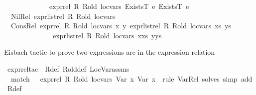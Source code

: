 \begin{isabellebody}
\ \ \ \ \ \ \ \ \ \ \ \ \ expr{\isacharunderscore}{\kern0pt}rel\ R\ R{\isacharunderscore}{\kern0pt}old\ loc{\isacharunderscore}{\kern0pt}vars\ {\isacharparenleft}{\kern0pt}ExistsT\ e{}{\isacharparenright}{\kern0pt}\ {\isacharparenleft}{\kern0pt}ExistsT\ e{}{\isacharparenright}{\kern0pt}{\isachardoublequoteclose}\isanewline
\ {\isacharbar}{\kern0pt}\ Nil{\isacharunderscore}{\kern0pt}Rel{\isacharcolon}{\kern0pt}\ {\isachardoublequoteopen}expr{\isacharunderscore}{\kern0pt}list{\isacharunderscore}{\kern0pt}rel\ R\ R{\isacharunderscore}{\kern0pt}old\ loc{\isacharunderscore}{\kern0pt}vars\ {\isacharbrackleft}{\kern0pt}{\isacharbrackright}{\kern0pt}\ {\isacharbrackleft}{\kern0pt}{\isacharbrackright}{\kern0pt}{\isachardoublequoteclose}\isanewline
\ {\isacharbar}{\kern0pt}\ Cons{\isacharunderscore}{\kern0pt}Rel{\isacharcolon}{\kern0pt}\ {\isachardoublequoteopen}{\isasymlbrakk}expr{\isacharunderscore}{\kern0pt}rel\ R\ R{\isacharunderscore}{\kern0pt}old\ loc{\isacharunderscore}{\kern0pt}vars\ x\ y{\isacharsemicolon}{\kern0pt}\ expr{\isacharunderscore}{\kern0pt}list{\isacharunderscore}{\kern0pt}rel\ R\ R{\isacharunderscore}{\kern0pt}old\ loc{\isacharunderscore}{\kern0pt}vars\ xs\ ys{\isasymrbrakk}\ {\isasymLongrightarrow}\isanewline
\ \ \ \ \ \ \ \ \ \ \ \ \ \ expr{\isacharunderscore}{\kern0pt}list{\isacharunderscore}{\kern0pt}rel\ R\ R{\isacharunderscore}{\kern0pt}old\ loc{\isacharunderscore}{\kern0pt}vars\ {\isacharparenleft}{\kern0pt}x{\isacharhash}{\kern0pt}xs{\isacharparenright}{\kern0pt}\ {\isacharparenleft}{\kern0pt}y{\isacharhash}{\kern0pt}ys{\isacharparenright}{\kern0pt}{\isachardoublequoteclose}%
\begin{isamarkuptext}%
Eisbach tactic to prove two expressions are in the expression relation%
\end{isamarkuptext}\isamarkuptrue%
\isamarkupfalse%
\ expr{\isacharunderscore}{\kern0pt}rel{\isacharunderscore}{\kern0pt}tac\ \ R{\isacharunderscore}{\kern0pt}def\ R{\isacharunderscore}{\kern0pt}old{\isacharunderscore}{\kern0pt}def\ LocVar{\isacharunderscore}{\kern0pt}assms\ {\isacharequal}{\kern0pt}\ \isanewline
\ \ {\isacharparenleft}{\kern0pt}match\ \ \ {\isachardoublequoteopen}expr{\isacharunderscore}{\kern0pt}rel\ {\isacharquery}{\kern0pt}R\ {\isacharquery}{\kern0pt}R{\isacharunderscore}{\kern0pt}old\ {\isacharquery}{\kern0pt}loc{\isacharunderscore}{\kern0pt}vars\ {\isacharparenleft}{\kern0pt}Var\ {\isacharquery}{\kern0pt}x{}{\isacharparenright}{\kern0pt}\ {\isacharparenleft}{\kern0pt}Var\ {\isacharquery}{\kern0pt}x{}{\isacharparenright}{\kern0pt}{\isachardoublequoteclose}\ {\isasymRightarrow}\ {\isacartoucheopen}rule\ Var{\isacharunderscore}{\kern0pt}Rel{\isacharcomma}{\kern0pt}\ solves\ {\isasymopen}simp\ add{\isacharcolon}{\kern0pt}\ R{\isacharunderscore}{\kern0pt}def{\isasymclose}{\isacartoucheclose}\ {\isasymbar}\isanewline

\end{isabellebody}
